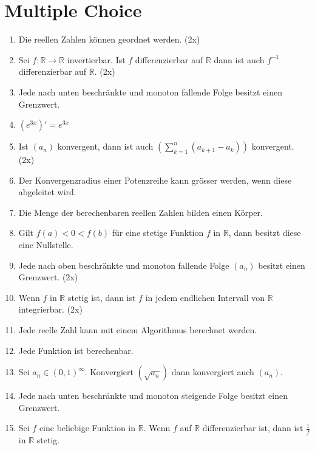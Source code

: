 \documentclass{article}
\begin{document}
\section*{Multiple Choice}

\begin{enumerate}[label=(\arabic*)]
    \item Die reellen Zahlen können geordnet werden. (2x)
    
    \item Sei $f: \mathbb{R} \to \mathbb{R}$ invertierbar. Ist $f$ differenzierbar auf $\mathbb{R}$ dann ist auch $f^{-1}$ differenzierbar auf $\mathbb{R}$. (2x)
    
    \item Jede nach unten beschränkte und monoton fallende Folge besitzt einen Grenzwert.
    
    \item $(e^{3x})' = e^{3x}$
    
    \item Ist $(a_n)$ konvergent, dann ist auch $(\sum_{k = 1}^{n}(a_{k + 1} - a_k))$ konvergent. (2x)
    
    \item Der Konvergenzradius einer Potenzreihe kann grösser werden, wenn diese abgeleitet wird.

    \item Die Menge der berechenbaren reellen Zahlen bilden einen Körper.
    
    \item Gilt $f(a) < 0 < f(b)$ für eine stetige Funktion $f$ in $\mathbb{R}$, dann besitzt diese eine Nullstelle.
    
    \item Jede nach oben beschränkte und monoton fallende Folge $(a_n)$ besitzt einen Grenzwert. (2x)
    
    \item Wenn $f$ in $\mathbb{R}$ stetig ist, dann ist $f$ in jedem endlichen Intervall von $\mathbb{R}$ integrierbar. (2x)
        
    \item Jede reelle Zahl kann mit einem Algorithmus berechnet werden.
    
    \item Jede Funktion ist berechenbar.
    
    \item Sei $a_n \in (0, 1)^{\infty}$. Konvergiert $(\sqrt{a_n})$ dann konvergiert auch $(a_n)$.
    
    \item Jede nach unten beschränkte und monoton steigende Folge besitzt einen Grenzwert.
    
    \item Sei $f$ eine beliebige Funktion in $\mathbb{R}$. Wenn $f$ auf $\mathbb{R}$ differenzierbar ist, dann ist $\frac{1}{f}$ in $\mathbb{R}$ stetig.
\end{enumerate}
\end{document}
